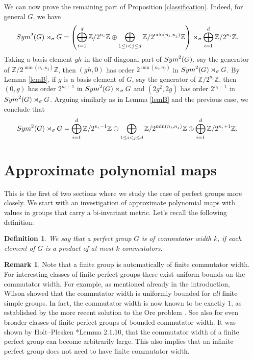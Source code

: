 \documentclass[a4paper,11pt]{amsproc}
\theoremstyle{plain}
\newtheorem{definition}[theorem]{Definition}
\theoremstyle{definition}
\newtheorem{remark}[theorem]{Remark}
\begin{document}
We can now prove the remaining part of Proposition \ref{classification}. Indeed, for general $G$, we have 
\[
{\rm Sym}^2(G)\rtimes_\sigma G = \left(\bigoplus_{i=1}^d \mathbb{Z}/2^{n_i}\mathbb{Z} \oplus \bigoplus_{1\leq i<j\leq d} \mathbb{Z}/2^{\min(n_i,n_j)}\mathbb{Z} \right)\rtimes_\sigma \bigoplus_{i=1}^d \mathbb{Z}/2^{n_i}\mathbb{Z}.
\]
Taking a basis element $gh$ in the off-diagonal part of ${\rm Sym}^2(G)$, say the generator of $\mathbb{Z}/2^{\min(n_i,n_j)}\mathbb{Z}$, then $(gh,0)$ has order $2^{\min(n_i,n_j)}$ in ${\rm Sym}^2(G)\rtimes_\sigma G$. By Lemma \ref{lemB}, if $g$ is a basis element of $G$, say the generator of $\mathbb{Z}/2^{n_i}\mathbb{Z}$, then $(0,g)$ has order $2^{n_i+1}$ in ${\rm Sym}^2(G)\rtimes_\sigma G$ and  $(2g^2,2g)$ has order $2^{n_i-1}$ in ${\rm Sym}^2(G)\rtimes_\sigma G$. Arguing similarly as in Lemma \ref{lemB} and the previous case, we conclude that 
\[
{\rm Sym}^2(G)\rtimes_\sigma G= \bigoplus_{i=1}^d \mathbb{Z}/2^{n_i-1}\mathbb{Z} \oplus \bigoplus_{1\leq i<j\leq d} \mathbb{Z}/2^{\min(n_i,n_j)}\mathbb{Z} \oplus \bigoplus_{i=1}^d \mathbb{Z}/2^{n_i+1}\mathbb{Z}.
\]
 

\section{Approximate polynomial maps}
\label{sec:apppol}

This is the first of two sections where we study the case of perfect groups more closely. We start with an investigation of approximate polynomial maps with values in groups that carry a bi-invariant metric. Let's recall the following definition:

\begin{definition}
We say that a perfect group $G$ is of commutator width $k$, if each element of $G$ is a product of at most $k$ commutators.
\end{definition}

\begin{remark}
\label{rem:simple}
Note that a finite group is automatically of finite commutator width. For interesting classes of finite perfect groups there exist uniform bounds on the commutator width. For example, as mentioned already in the introduction, Wilson \cite{wilson} showed that the commutator width is uniformly bounded for \emph{all} finite simple groups. In fact, the commutator width is now known to be exactly $1$, as established by the more recent solution to the Ore problem \cite{ore}.
See also \cite{nikolov} for even broader classes of finite perfect groups of bounded commutator width. It was shown by Holt--Plesken \cite{holtplesken}*{Lemma 2.1.10}, that the commutator width of a finite perfect group can become arbitrarily large. This also implies that an infinite perfect group does not need to have finite commutator width.
\end{remark}
\end{document}
